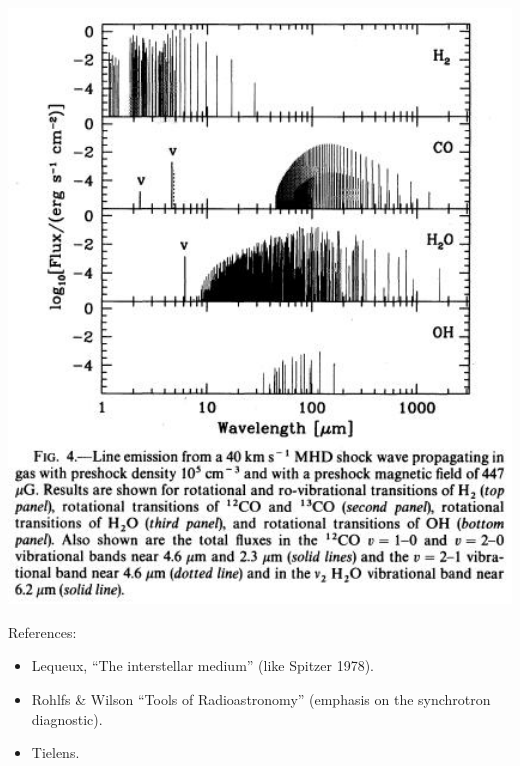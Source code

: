 
\begin{center}
\includegraphics[width=14cm,height=!]{./E/Fig_4_Kaufman_Neufeld.jpg}
\end{center}



References: 

\begin{itemize}

\item Lequeux, ``The interstellar medium'' (like Spitzer 1978).
\item Rohlfs \& Wilson ``Tools of Radioastronomy'' (emphasis on the
  synchrotron diagnostic). 
\item Tielens.
\end{itemize}



